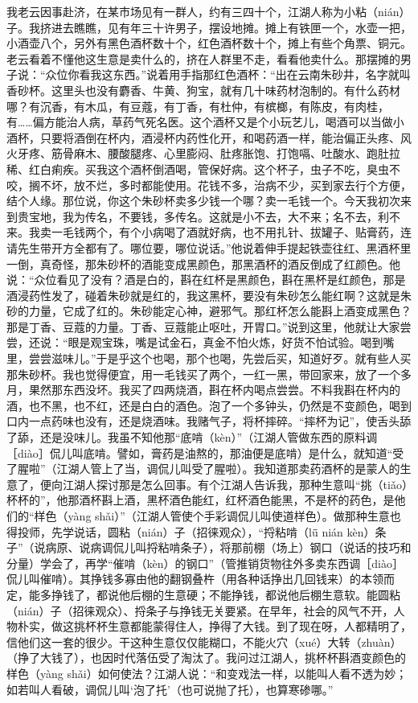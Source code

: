 \documentclass[12pt,UTF8]{ctexbook}
\begin{document}
我老云因事赴济，在某市场见有一群人，约有三四十个，江湖人称为小粘（nián）子。我挤进去瞧瞧，见有年三十许男子，摆设地摊。摊上有铁匣一个，水壶一把，小酒壶八个，另外有黑色酒杯数十个，红色酒杯数十个，摊上有些个角票、铜元。老云看着不懂他这生意是卖什么的，挤在人群里不走，看看他卖什么。那摆摊的男子说：“众位你看我这东西。”说着用手指那红色酒杯：“出在云南朱砂井，名字就叫香砂杯。这里头也没有麝香、牛黄、狗宝，就有几十味药材泡制的。有什么药材哪？有沉香，有木瓜，有豆蔻，有丁香，有杜仲，有槟榔，有陈皮，有肉桂，有……偏方能治人病，草药气死名医。这个酒杯又是个小玩艺儿，喝酒可以当做小酒杯，只要将酒倒在杯内，酒浸杯内药性化开，和喝药酒一样，能治偏正头疼、风火牙疼、筋骨麻木、腰酸腿疼、心里膨闷、肚疼胀饱、打饱嗝、吐酸水、跑肚拉稀、红白痢疾。买我这个酒杯倒酒喝，管保好病。这个杯子，虫子不吃，臭虫不咬，搁不坏，放不烂，多时都能使用。花钱不多，治病不少，买到家去行个方便，结个人缘。那位说，你这个朱砂杯卖多少钱一个哪？卖一毛钱一个。今天我初次来到贵宝地，我为传名，不要钱，多传名。这就是小不去，大不来；名不去，利不来。我卖一毛钱两个，有个小病喝了酒就好病，也不用扎针、拔罐子、贴膏药，连请先生带开方全都有了。哪位要，哪位说话。”他说着伸手提起铁壶往红、黑酒杯里一倒，真奇怪，那朱砂杯的酒能变成黑颜色，那黑酒杯的酒反倒成了红颜色。他说：“众位看见了没有？酒是白的，斟在红杯是黑颜色，斟在黑杯是红颜色，那是酒浸药性发了，碰着朱砂就是红的，我这黑杯，要没有朱砂怎么能红啊？这就是朱砂的力量，它成了红的。朱砂能定心神，避邪气。那红杯怎么能斟上酒变成黑色？那是丁香、豆蔻的力量。丁香、豆蔻能止呕吐，开胃口。”说到这里，他就让大家尝尝，还说：“眼是观宝珠，嘴是试金石，真金不怕火炼，好货不怕试验。喝到嘴里，尝尝滋味儿。”于是乎这个也喝，那个也喝，先尝后买，知道好歹。就有些人买那朱砂杯。我也觉得便宜，用一毛钱买了两个，一红一黑，带回家来，放了一个多月，果然那东西没坏。我买了四两烧酒，斟在杯内喝点尝尝。不料我斟在杯内的酒，也不黑，也不红，还是白白的酒色。泡了一个多钟头，仍然是不变颜色，喝到口内一点药味也没有，还是烧酒味。我赌气子，将杯摔碎。“摔杯为记”，使舌头舔了舔，还是没味儿。我虽不知他那“底啃（kèn）”（江湖人管做东西的原料调［diào］侃儿叫底啃。譬如，膏药是油熬的，那油便是底啃）是什么，就知道“受了腥啦”（江湖人管上了当，调侃儿叫受了腥啦）。我知道那卖药酒杯的是蒙人的生意了，便向江湖人探讨那是怎么回事。有个江湖人告诉我，那种生意叫“挑（tiǎo）杯杯的”，他那酒杯斟上酒，黑杯酒色能红，红杯酒色能黑，不是杯的药色，是他们的“样色（yàng shǎi）”（江湖人管使个手彩调侃儿叫使道样色）。做那种生意也得投师，先学说话，圆粘（nián）子（招徕观众），“捋粘啃（lǖ nián kèn）条子”（说病原、说病调侃儿叫捋粘啃条子），将那前棚（场上）钢口（说话的技巧和分量）学会了，再学“催啃（kèn）的钢口”（管推销货物往外多卖东西调［diào］侃儿叫催啃）。其挣钱多寡由他的翻钢叠杵（用各种话挣出几回钱来）的本领而定，能多挣钱了，都说他后棚的生意硬；不能挣钱，都说他后棚生意软。能圆粘（nián）子（招徕观众）、捋条子与挣钱无关要紧。在早年，社会的风气不开，人物朴实，做这挑杯杯生意都能蒙得住人，挣得了大钱。到了现在呀，人都精明了，信他们这一套的很少。干这种生意仅仅能糊口，不能火穴（xué）大转（zhuàn）（挣了大钱了），也因时代落伍受了淘汰了。我问过江湖人，挑杯杯斟酒变颜色的样色（yàng shǎi）如何使法？江湖人说：“和变戏法一样，以能叫人看不透为妙；如若叫人看破，调侃儿叫‘泡了托’（也可说抛了托），也算寒碜哪。”
\end{document}
